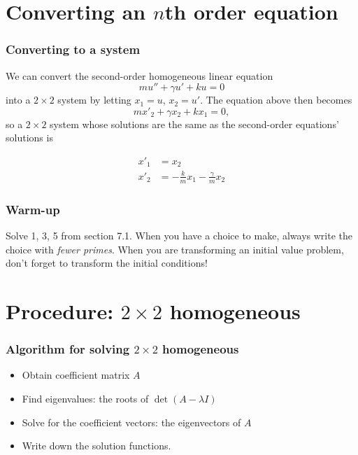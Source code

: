 \def\encoding{UTF-8}

\def\mytitle{Systems of equations}
\def\affiliation{The College of Idaho}
\def\myauthor{Math 352 Differential Equations}
\def\mydate{6 May 2013}
\def\latexmode{beamer}

\def\htmlheaderlevel{2}
\section{Converting an $ n $th order equation}
\label{convertingannthorderequation}

\begin{frame}

\frametitle{Converting to a system}
\label{convertingtoasystem}

We can convert the second-order homogeneous linear equation
\[
    mu'' + \gamma u' + ku = 0
\]
into a $ 2 \times 2 $ system by letting $ x_1 = u $, $ x_2 = u' $. The equation above then becomes
\[
    mx'_2 + \gamma x_2 + kx_1 = 0,
\]
so a $ 2 \times 2$ system whose solutions are the same as the second-order equations' solutions is
 
    \begin{align*}
        x'_1 &= x_2 \\
        x'_2 &= -\frac{k}{m} x_1 - \frac{\gamma}{m} x_2
    \end{align*}


\end{frame}

\begin{frame}

\frametitle{Warm-up}
\label{warm-up}

Solve 1, 3, 5 from section 7.1. When you have a choice to make, always write the choice with \emph{fewer primes}. When you are transforming an initial value problem, don't forget to transform the initial conditions!

\end{frame}

\section{Procedure: $ 2 \times 2 $ homogeneous}
\label{procedure:2times2homogeneous}

\begin{frame}

\frametitle{Algorithm for solving $ 2 \times 2$ homogeneous}
\label{algorithmforsolving2times2homogeneous}

\begin{itemize}
\item Obtain coefficient matrix $ A $

\item Find eigenvalues: the roots of $ \det(A - \lambda I) $

\item Solve for the coefficient vectors: the eigenvectors of $ A $

\item Write down the solution functions.

\end{itemize}

\end{frame}

